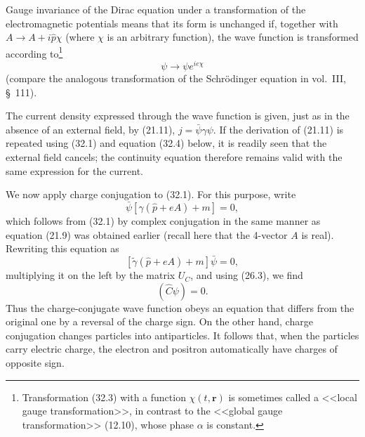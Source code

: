 Gauge invariance of the Dirac equation under a transformation of the electromagnetic potentials means that its form is unchanged if, together with $A\to A+i\hat p\chi$ (where $\chi$ is an arbitrary function), the wave function is transformed according to\footnote{Transformation (32.3) with a function $\chi(t,\mathbf r)$ is sometimes called a <<local gauge transformation>>, in contrast to the <<global gauge transformation>> (12.10), whose phase $\alpha$ is constant.}
\begin{equation}
\psi\to\psi e^{ie\chi}
\tag{32.3}
\end{equation}
(compare the analogous transformation of the Schrödinger equation in vol.~III, \S~111).

The current density expressed through the wave function is given, just as in the absence of an external field, by (21.11), $j=\bar\psi\gamma\psi$. If the derivation of (21.11) is repeated using (32.1) and equation (32.4) below, it is readily seen that the external field cancels; the continuity equation therefore remains valid with the same expression for the current.

We now apply charge conjugation to (32.1). For this purpose, write
\begin{equation}
\bar\psi[\gamma(\hat p+eA)+m]=0,
\tag{32.4}
\end{equation}
which follows from (32.1) by complex conjugation in the same manner as equation (21.9) was obtained earlier (recall here that the 4-vector $A$ is real). Rewriting this equation as
\[
[\widetilde\gamma(\hat p+eA)+m]\bar\psi=0,
\]
multiplying it on the left by the matrix $U_C$, and using (26.3), we find
\begin{equation}
[\gamma(\hat p+eA)-m](\widehat C\psi)=0.
\tag{32.5}
\end{equation}
Thus the charge-conjugate wave function obeys an equation that differs from the original one by a reversal of the charge sign. On the other hand, charge conjugation changes particles into antiparticles. It follows that, when the particles carry electric charge, the electron and positron automatically have charges of opposite sign.

